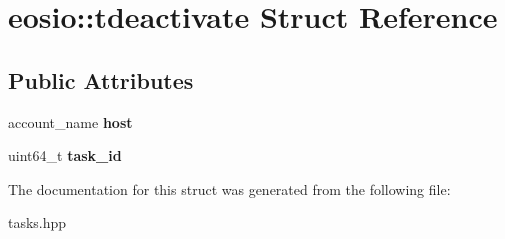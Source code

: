 \hypertarget{structeosio_1_1tdeactivate}{}\section{eosio\+:\+:tdeactivate Struct Reference}
\label{structeosio_1_1tdeactivate}
\subsection*{Public Attributes}
\begin{DoxyCompactItemize}
\item 
\mbox{\label{structeosio_1_1tdeactivate_a25eec20215a23f896c9ed883d301a9f1}} 
account\+\_\+name {\bfseries host}
\item 
\mbox{\label{structeosio_1_1tdeactivate_a5a9c47eb0be83d9f4379b0a4d7208da9}} 
uint64\+\_\+t {\bfseries task\+\_\+id}
\end{DoxyCompactItemize}


The documentation for this struct was generated from the following file\+:\begin{DoxyCompactItemize}
\item 
tasks.\+hpp\end{DoxyCompactItemize}
